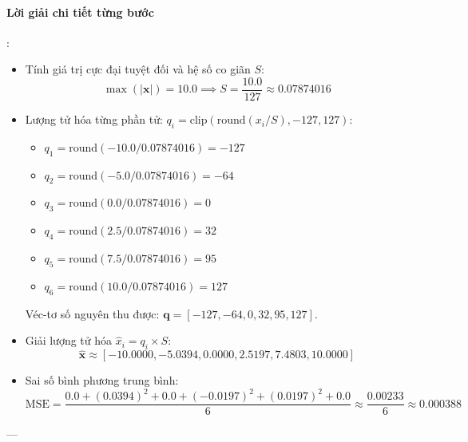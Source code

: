 \paragraph{Lời giải chi tiết từng bước}:
\begin{itemize}
  \item[1)] Tính giá trị cực đại tuyệt đối và hệ số co giãn $S$:
  \begin{equation*}
  \max(|\mathbf{x}|) = 10.0 \implies S = \frac{10.0}{127} \approx 0.07874016
  \end{equation*}
  \item[2)] Lượng tử hóa từng phần tử: $q_i = \text{clip}\left(\text{round}(x_i / S), -127, 127\right)$:
  \begin{itemize}
    \item $q_1 = \text{round}(-10.0 / 0.07874016) = -127$
    \item $q_2 = \text{round}(-5.0 / 0.07874016) = -64$
    \item $q_3 = \text{round}(0.0 / 0.07874016) = 0$
    \item $q_4 = \text{round}(2.5 / 0.07874016) = 32$
    \item $q_5 = \text{round}(7.5 / 0.07874016) = 95$
    \item $q_6 = \text{round}(10.0 / 0.07874016) = 127$
  \end{itemize}
  Véc-tơ số nguyên thu được: $\mathbf{q} = [-127, -64, 0, 32, 95, 127]$.
  \item[3)] Giải lượng tử hóa $\hat{x}_i = q_i \times S$:
  \begin{equation*}
  \hat{\mathbf{x}} \approx [-10.0000, -5.0394, 0.0000, 2.5197, 7.4803, 10.0000]
  \end{equation*}
  \item[4)] Sai số bình phương trung bình:
  \begin{equation*}
  \text{MSE} = \frac{0.0 + (0.0394)^2 + 0.0 + (-0.0197)^2 + (0.0197)^2 + 0.0}{6} \approx \frac{0.00233}{6} \approx 0.000388
  \end{equation*}
\end{itemize}

---

